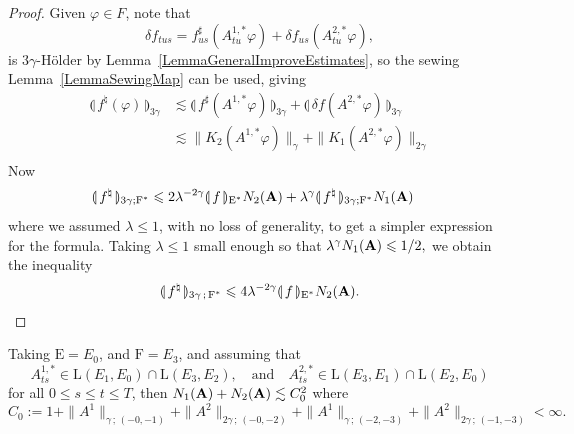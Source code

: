\documentclass[11pt,a4paper]{amsart}
\renewcommand{\leq}{\leqslant}
\theoremstyle{plain}%
\theoremstyle{definition}
\theoremstyle{remark}
\numberwithin{equation}{section} %
\begin{document}
\begin{proof}
Given $\varphi\in F$, note that
$$
\delta f_{tus} = f^\sharp_{us}(A^{1,*}_{tu}\varphi) + \delta f_{us}(A^{2,*}_{tu}\varphi),
$$
is $3\gamma$-H\"older by Lemma~\ref{LemmaGeneralImproveEstimates}, so the sewing Lemma~\ref{LemmaSewingMap} can be used, giving
\begin{equation*}
\begin{split}
\llparenthesis\, f^\natural(\varphi)\,\rrparenthesis_{3\gamma} 
&\lesssim \llparenthesis\,  f^\sharp (A^{1,*}\varphi) \,\rrparenthesis_{3\gamma} +  \llparenthesis\,  \delta f (A^{2,*}\varphi) \,\rrparenthesis_{3\gamma}\\
&\lesssim  \|  K_2(A^{1,*}\varphi) \|_\gamma +  \|  K_1(A^{2,*}\varphi)\|_{2\gamma}\\
\end{split}
\end{equation*}
Now
\begin{equation*}
\begin{split}
 \llparenthesis\, f^\natural\,\rrparenthesis_{3\gamma;\textrm{F}^*}
&\leq  2 \lambda^{-2\gamma}\llparenthesis\, f\,\rrparenthesis_{\textrm{E}^*} N_2({\bfA}) +  \lambda^{\gamma} \llparenthesis\, f^\natural\,\rrparenthesis_{3\gamma;\textrm{F}^*}  N_1({\bfA})
\end{split}
\end{equation*}
where we assumed  $\lambda \leq 1$, with no loss of generality, to get a simpler expression for the formula. 
Taking $\lambda\leq 1$ small enough so that
$
\lambda^{\gamma} N_1({\bfA}) \leq 1/2,
$
we obtain the  inequality
$$
\llparenthesis\, f^\natural \,\rrparenthesis_{3\gamma\,;\,\textrm{F}^*} \leq  4 \lambda^{-2\gamma} 
\llparenthesis\, f\,\rrparenthesis_{\textrm{E}^*} N_2({\bfA}).
$$
\end{proof}

\bigskip

Taking
$
\textrm{E} = E_0$, and $\textrm{F} = E_3$, 
and assuming that 
$$
A^{1,*}_{ts} \in \textrm{L}(E_1,E_0) \cap \textrm{L}(E_3,E_2)
,\quad
\text{and}\quad 
A^{2,*}_{ts} \in \textrm{L}(E_3 , E_1) \cap \textrm{L}(E_2,E_0)
$$ 
for all $0\leq s\leq t\leq T$, then 
$
N_1({\bf A})+N_2({\bf A}) \lesssim C_0^2
$ 
where
\begin{equation}
\label{EqDefnC0}
C_0 := 1+\|A^1\|_{\gamma\,;\,(-0,-1)}  + \|A^2\|_{2\gamma\,;\,(-0,-2)} +  \|A^1\|_{\gamma\,;\,(-2,-3)}  + \|A^2\|_{2\gamma\,;\,(-1,-3)}  < \infty .
\end{equation}

\smallskip
\end{document}
